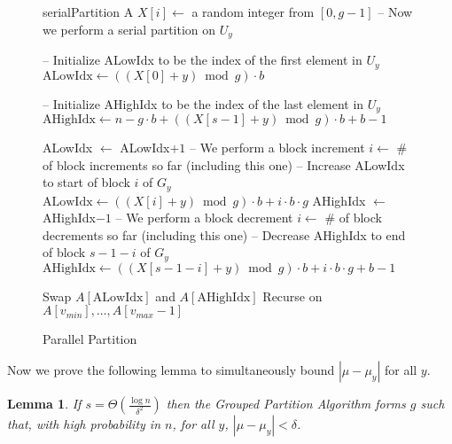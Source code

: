 \documentclass[twocolumn, twoside, 12pt]{article}
\newtheorem{lemma}{Lemma}
\begin{document}
\begin{figure*}
	\caption{Parallel Partition}
	\label{alg:parallelPartition}
	\begin{algorithmic}[1]
			\State serialPartition A
		\Else
				\State $X[i] \gets$ a random integer from $[0,g-1]$ 
			\EndFor
				\State -- Now we perform a serial partition on $U_y$

				\State -- Initialize ALowIdx to be the index of the first element in $U_y$
				\State $\text{ALowIdx} \gets ((X[0]+y) \bmod g)\cdot b$

				\State -- Initialize AHighIdx to be the index of the last element in $U_y$
				\State $\text{AHighIdx} \gets n - g\cdot b + ((X[s-1]+y) \bmod g)\cdot b + b-1$

						\State ALowIdx $\gets$ ALowIdx$+1$
							\State -- We perform a block increment
							\State $i \gets $ \# of block increments so far (including this one)
							\State -- Increase ALowIdx to start of block $i$ of $G_y$
							\State $\text{ALowIdx} \gets ((X[i] + y)\bmod g) \cdot b + i\cdot b\cdot g$
						\EndIf
					\EndWhile
						\State AHighIdx $\gets$ AHighIdx$-1$
							\State -- We perform a block decrement
							\State $i \gets $ \# of block decrements so far (including this one)
							\State -- Decrease AHighIdx to end of block $s-1-i$ of $G_y$
							\State $\text{AHighIdx} \gets ((X[s-1-i] + y)\bmod g) \cdot b + i\cdot b\cdot g + b - 1$
						\EndIf
					\EndWhile

					\State Swap $A[\text{ALowIdx}]$ and $A[\text{AHighIdx}]$
				\EndWhile
			\EndFor
			\State Recurse on $A[v_{min}],\ldots,A[v_{max}-1]$
		\EndIf
	\end{algorithmic}	
\end{figure*}

Now we prove the following lemma to simultaneously bound $|\mu - \mu_y|$ for all $y$. 
\begin{lemma}
If $s=\Theta(\frac{\log n}{\delta^2})$ then the Grouped Partition Algorithm forms $g$ such that, with high probability in $n$, for all $y$, $|\mu - \mu_y| < \delta$.
\label{lem:groupedAlgDelta}
\end{lemma}
\end{document}

